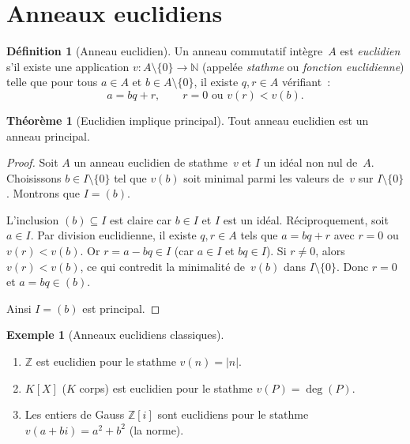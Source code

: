 \documentclass[12pt,a4paper,openany]{book}
\theoremstyle{definition}
\newtheorem{definition}{Définition}[chapter]
\newtheorem{theoreme}{Théorème}[chapter]
\newtheorem{exemple}{Exemple}[chapter]
\newcommand{\N}{\mathbb{N}}
\newcommand{\Z}{\mathbb{Z}}
\begin{document}
\section{Anneaux euclidiens}\label{sec:anneaux-euclidiens}

\begin{definition}[Anneau euclidien]\label{def:anneau-euclidien}
Un anneau commutatif intègre~$A$ est \emph{euclidien} s'il existe une
application $v \colon A \setminus \{0\} \to \N$ (appelée
\emph{stathme} ou \emph{fonction euclidienne}) telle que
pour tous $a \in A$ et $b \in A \setminus \{0\}$, il existe
$q, r \in A$ vérifiant~:
\[
  a = bq + r, \qquad
  r = 0 \text{ ou } v(r) < v(b).
\]
\end{definition}

\begin{theoreme}[Euclidien implique principal]%
\label{thm:euclidien-principal}
Tout anneau euclidien est un anneau principal.
\end{theoreme}

\begin{proof}
Soit $A$ un anneau euclidien de stathme~$v$ et $I$ un idéal non nul
de~$A$. Choisissons $b \in I \setminus \{0\}$ tel que $v(b)$ soit
minimal parmi les valeurs de~$v$ sur $I \setminus \{0\}$. Montrons que
$I = (b)$.

L'inclusion $(b) \subseteq I$ est claire car $b \in I$ et $I$ est un
idéal. Réciproquement, soit $a \in I$. Par division euclidienne, il
existe $q, r \in A$ tels que $a = bq + r$ avec $r = 0$ ou $v(r) < v(b)$.
Or $r = a - bq \in I$ (car $a \in I$ et $bq \in I$). Si $r \neq 0$,
alors $v(r) < v(b)$, ce qui contredit la minimalité de~$v(b)$ dans
$I \setminus \{0\}$. Donc $r = 0$ et $a = bq \in (b)$.

Ainsi $I = (b)$ est principal.
\end{proof}

\begin{exemple}[Anneaux euclidiens classiques]\label{ex:anneaux-euclidiens}
\begin{enumerate}[label=\textup{(\alph*)}]
  \item $\Z$ est euclidien pour le stathme $v(n) = |n|$.
  \item $K[X]$ ($K$ corps) est euclidien pour le stathme
        $v(P) = \deg(P)$.
  \item Les entiers de Gauss $\Z[i]$ sont euclidiens pour le stathme
        $v(a + bi) = a^2 + b^2$ (la norme).
\end{enumerate}
\end{exemple}
\end{document}
